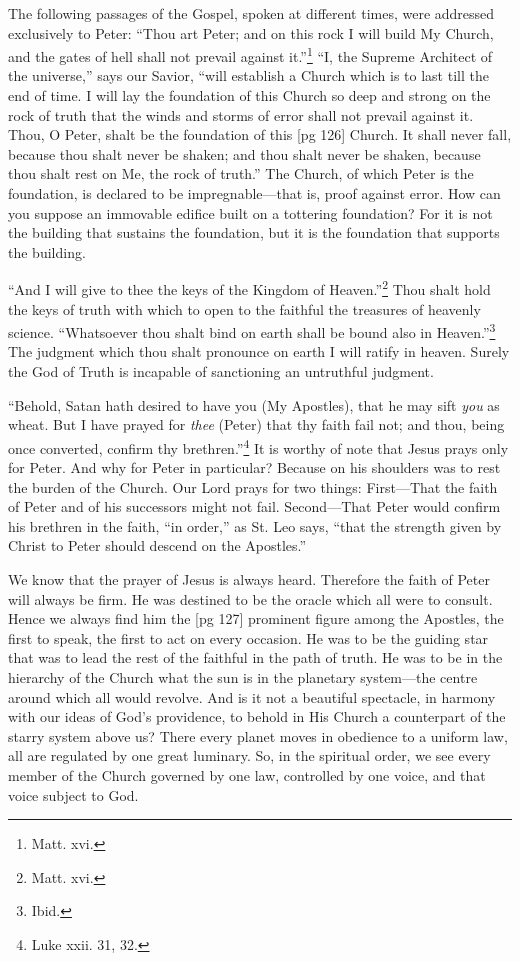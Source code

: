The following passages of the Gospel, spoken
at different times, were addressed exclusively to
Peter: “Thou art Peter; and on this rock I will
build My Church, and the gates of hell shall not
prevail against it.”\footnote{Matt.
xvi.} “I, the Supreme Architect
of the universe,” says our Savior, “will establish
a Church which is to last till the end of time. I
will lay the foundation of this Church so deep
and strong on the rock of truth that the winds
and storms of error shall not prevail against it.
Thou, O Peter, shalt be the foundation of this
[pg 126]
Church. It shall never fall, because thou shalt
never be shaken; and thou shalt never be shaken,
because thou shalt rest on Me, the rock of truth.”
The Church, of which Peter is the foundation, is
declared to be impregnable—that is, proof against
error. How can you suppose an immovable edifice
built on a tottering foundation? For it is not
the building that sustains the foundation, but it is
the foundation that supports the building.

“And I will give to thee the keys of the Kingdom
of Heaven.”\footnote{Matt.
xvi.} Thou shalt hold the keys of
truth with which to open to the faithful the treasures
of heavenly science. “Whatsoever thou shalt
bind on earth shall be bound also in Heaven.”\footnote{Ibid.}
The judgment which thou shalt pronounce on earth
I will ratify in heaven. Surely the God of Truth
is incapable of sanctioning an untruthful judgment.

“Behold, Satan hath desired to have you (My
Apostles), that he may sift \emph{you} as wheat. But
I have prayed for \emph{thee} (Peter) that thy faith fail
not; and thou, being once converted, confirm thy
brethren.”\footnote{Luke xxii.
31, 32.} It is worthy of note that Jesus
prays only for Peter. And why for Peter in particular?
Because on his shoulders was to rest
the burden of the Church. Our Lord prays for
two things: First—That the faith of Peter and
of his successors might not fail. Second—That
Peter would confirm his brethren in the faith, “in
order,” as St. Leo says, “that the strength given
by Christ to Peter should descend on the Apostles.”

We know that the prayer of Jesus is always
heard. Therefore the faith of Peter will always
be firm. He was destined to be the oracle which
all were to consult. Hence we always find him the
[pg 127]
prominent figure among the Apostles, the first to
speak, the first to act on every occasion. He was
to be the guiding star that was to lead the rest
of the faithful in the path of truth. He was to
be in the hierarchy of the Church what the sun
is in the planetary system—the centre around
which all would revolve. And is it not a beautiful
spectacle, in harmony with our ideas of God's
providence, to behold in His Church a counterpart
of the starry system above us? There every
planet moves in obedience to a uniform law, all
are regulated by one great luminary. So, in the
spiritual order, we see every member of the
Church governed by one law, controlled by one
voice, and that voice subject to God.

